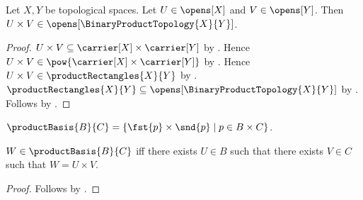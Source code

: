 \begin{theorem}\label{product_of_open_sets_is_open}
    Let $X,Y$ be topological spaces.
    Let $U\in\opens[X]$ and $V\in\opens[Y]$.
    Then $U\times V\in\opens[\BinaryProductTopology{X}{Y}]$.
\end{theorem}
\begin{proof}
    $U\times V\subseteq\carrier[X]\times\carrier[Y]$ by
        .
    Hence $U\times V\in\pow{\carrier[X]\times\carrier[Y]}$ by .
    Hence $U\times V\in\productRectangles{X}{Y}$ by .
    $\productRectangles{X}{Y}\subseteq\opens[\BinaryProductTopology{X}{Y}]$ by
        .
    Follows by .
\end{proof}

\begin{definition}\label{product_basis}
    $\productBasis{B}{C}=\{\fst{p}\times\snd{p}\mid p\in B\times C\}$.
\end{definition}

\begin{proposition}\label{product_basis_iff}
    $W\in\productBasis{B}{C}$ iff there exists $U\in B$ such that
        there exists $V\in C$ such that $W=U\times V$.
\end{proposition}
\begin{proof}
    Follows by .
\end{proof}


